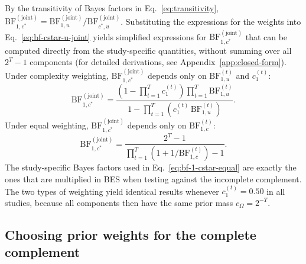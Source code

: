 \documentclass[letterpaper,11pt,oneside]{article}
\begin{document}
By the transitivity of Bayes factors in Eq.~\eqref{eq:transitivity}, $\mathrm{BF}^{(\text{joint})}_{1,c^*} = \mathrm{BF}^{(\text{joint})}_{1,u}/\mathrm{BF}^{(\text{joint})}_{c^*,u}$. Substituting the expressions for the weights into Eq.~\eqref{eq:bf-cstar-u-joint} yields simplified expressions for $\mathrm{BF}^{(\text{joint})}_{1,c^*}$ that can be computed directly from the study-specific quantities, without summing over all $2^T-1$ components (for detailed derivations, see Appendix~\ref{app:closed-form}). Under complexity weighting, $\mathrm{BF}^{(\text{joint})}_{1,c^*}$ depends only
on $\mathrm{BF}^{(t)}_{1,u}$ and $c_1^{(t)}$:
\begin{equation}
\label{eq:bf-1-cstar-complexity}
\mathrm{BF}^{(\text{joint})}_{1,c^*}
= \frac{\left(1-\prod_{t=1}^{T} c_1^{(t)}\right)\prod_{t=1}^{T}\mathrm{BF}^{(t)}_{1,u}}
       {1-\prod_{t=1}^{T}\left(c_1^{(t)}\,\mathrm{BF}^{(t)}_{1,u}\right)}.
\end{equation}
Under equal weighting, $\mathrm{BF}^{(\text{joint})}_{1,c^*}$ depends only on $\mathrm{BF}^{(t)}_{1,c}$:
\begin{equation}
\label{eq:bf-1-cstar-equal}
\mathrm{BF}^{(\text{joint})}_{1,c^*}
= \frac{2^T-1}{\prod_{t=1}^{T}\left(1 + 1/\mathrm{BF}^{(t)}_{1,c}\right) - 1}.
\end{equation}
The study-specific Bayes factors used in Eq.~\eqref{eq:bf-1-cstar-equal} are exactly the ones that are multiplied in BES when testing against the incomplete complement. The two types of weighting yield identical results whenever $c_1^{(t)} = 0.50$ in all studies, because all components then have the same prior mass $c_\Omega = 2^{-T}$.

\subsection{Choosing prior weights for the complete complement}
\end{document}
